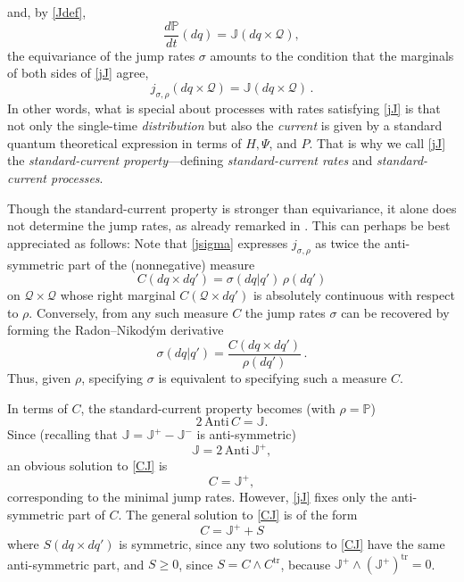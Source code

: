 \documentclass[12pt]{article}
\newcommand{\1}{\mathbf{1}} %
\newcommand{\tr}{\mathrm{tr}} %
\newcommand{\conf}{\mathcal{Q}} %
\newcommand{\measure}{\mathbb{P}} %
\newcommand{\current}{\mathbb{J}}
\newcommand{\pov}{{P}}%
\begin{document}
and, by \eqref{Jdef},
\begin{equation}
   \frac{d\measure}{dt}(dq) = \current(dq \times \conf),
\end{equation}
the equivariance of the jump rates $\sigma$ amounts to the condition
that the marginals of both sides of \eqref{jJ} agree,
\begin{equation}
   j_{\sigma,\rho} (dq \times \conf) = \current (dq \times \conf)\,.
\end{equation}
In other words, what is special about processes with rates satisfying
\eqref{jJ} is that not only the single-time \emph{distribution} but
also the \emph{current} is given by a standard quantum theoretical
expression in terms of $H, \Psi$, and $\pov$. That is why we call
\eqref{jJ} the \emph{standard-current property}---defining
\emph{standard-current rates} and \emph{standard-current processes}.

Though the standard-current property is stronger than equivariance, it
alone does not determine the jump rates, as already remarked in
\cite{BD,Roy}. This can perhaps be best appreciated as follows: Note
that \eqref{jsigma} expresses $j_{\sigma,\rho}$ as twice the
anti-symmetric part of the (nonnegative) measure
\begin{equation}
  C(dq \times dq') = \sigma(dq|q') \, \rho(dq')
\end{equation}
on $\conf \times \conf$ whose right marginal $C(\conf \times dq')$ is
absolutely continuous with respect to $\rho$. Conversely, from any
such measure $C$ the jump rates $\sigma$ can be recovered by forming
the Radon--Nikod\'ym derivative
\begin{equation}
   \sigma(dq|q') = \frac{C(dq \times dq')}{\rho(dq')}\,.
\end{equation}
Thus, given $\rho$, specifying $\sigma$ is equivalent to specifying
such a measure $C$.

In terms of $C$, the standard-current property becomes (with $\rho =
\measure$)
\begin{equation}\label{CJ}
   2 \, \mathrm{Anti} \, C = \current.
\end{equation}
Since (recalling that $\current = \current^+ - \current^-$ is
anti-symmetric)
\begin{equation}
   \current = 2 \, \mathrm{Anti} \, \current^+,
\end{equation}
an obvious solution to \eqref{CJ} is
\[
   C = \current^+,
\]
corresponding to the minimal jump rates. However, \eqref{jJ} fixes
only the anti-symmetric part of $C$. The general solution to
\eqref{CJ} is of the form
\begin{equation}
   C = \current^+ + S
\end{equation}
where $S(dq \times dq')$ is symmetric, since any two solutions to
\eqref{CJ} have the same anti-symmetric part, and $S \geq 0$, since $S
= C \wedge C^\tr$, because $\current^+ \wedge (\current^+)^\tr =0$.
\end{document}
